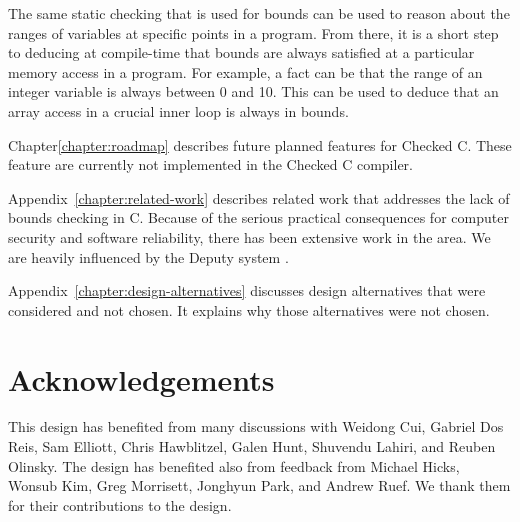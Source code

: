 The same static checking that is used for bounds can be used to reason
about the ranges of variables at specific points in a program. From
there, it is a short step to deducing at compile-time that bounds are
always satisfied at a particular memory access in a program. For
example, a fact can be that the range of an integer variable 
is always between 0 and 10. This can be used to deduce that an array
access in a crucial inner loop is always in bounds.

Chapter\ref{chapter:roadmap} describes future planned features for Checked C.
These feature are currently not implemented in the Checked C compiler.


Appendix~\ref{chapter:related-work} describes related work that addresses
the lack of bounds checking in C.  Because of the serious practical consequences
for computer security and software reliability, there has been extensive work
in the area.  We are heavily influenced by the Deputy system \cite{Feng2006,Condit2007}.

Appendix~\ref{chapter:design-alternatives} discusses design alternatives
that were considered and not chosen.  It explains why those alternatives were
not chosen.

\section{Acknowledgements}

This design has benefited from many discussions with Weidong Cui, Gabriel Dos Reis,
Sam Elliott, Chris Hawblitzel, Galen Hunt, Shuvendu Lahiri, and Reuben Olinsky.  The design has
benefited also from feedback from Michael Hicks, Wonsub Kim, Greg
Morrisett, Jonghyun Park, and Andrew Ruef. We thank them for their contributions to
the design.


